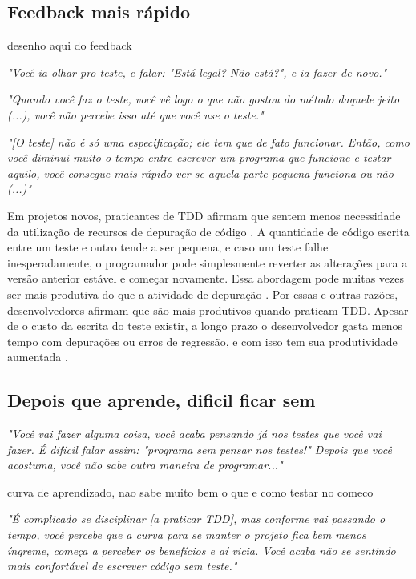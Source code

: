 \subsection{Feedback mais rápido}

desenho aqui do feedback

\textit{"Você ia olhar pro teste, e falar: "Está legal? Não está?", e ia fazer de novo."}

\textit{"Quando você faz o teste, você vê logo o que não gostou do método daquele jeito (...), você
não percebe isso até que você use o teste."}

\textit{"[O teste] não é só uma especificação; ele tem que de fato funcionar. Então,
como você diminui muito o tempo entre escrever um programa que funcione e testar aquilo,
você consegue mais rápido ver se aquela parte pequena funciona ou não (...)"}



Em projetos novos, praticantes de TDD afirmam que sentem menos necessidade da
utilização de recursos de depuração de código \cite{george-williams-experiment} 
\cite{janzen-arch-improvement}. 
A quantidade de código
escrita entre um teste e outro tende a ser pequena, e caso um teste falhe
inesperadamente, o programador pode simplesmente reverter as alterações para a 
versão anterior estável e começar novamente. Essa abordagem pode muitas vezes
ser mais produtiva do que a atividade de depuração 
\cite{janzen-arch-improvement}. Por essas e outras razões, desenvolvedores afirmam 
que são mais produtivos quando praticam TDD. Apesar de o custo da escrita do teste
existir, a longo prazo o desenvolvedor gasta menos tempo com depurações ou 
erros de regressão, e com isso tem sua produtividade aumentada
\cite{george-e-williams}.



\subsection{Depois que aprende, dificil ficar sem}

\textit{"Você vai fazer alguma coisa, você acaba pensando já nos testes que você vai fazer. É difícil 
falar assim: "programa sem pensar nos testes!" Depois que você acostuma, você não sabe outra
maneira de programar..."}

curva de aprendizado, nao sabe muito bem o que e como testar no comeco

\textit{"É complicado se disciplinar [a praticar TDD], mas conforme vai passando o tempo, 
você percebe que a curva para se manter o projeto fica bem menos íngreme, 
começa a perceber os benefícios e aí vicia. Você acaba não se sentindo
mais confortável de escrever código sem teste."}

